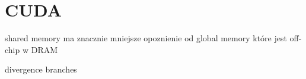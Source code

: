 \section{CUDA}
shared memory ma znacznie mniejsze opoznienie od global memory które jest off-chip w DRAM

divergence branches